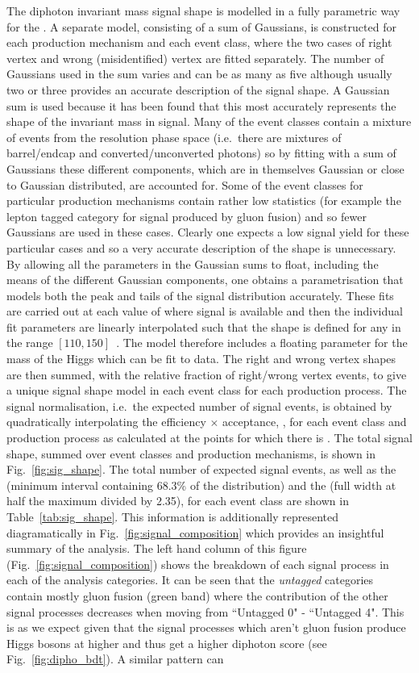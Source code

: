 The diphoton invariant mass signal shape is modelled in a fully parametric way for the \MFM. A separate model, consisting of a sum of Gaussians, is constructed for each production mechanism and each event class, where the two cases of right vertex and wrong (misidentified) vertex are fitted separately. The number of Gaussians used in the sum varies and can be as many as five although usually two or three provides an accurate description of the signal shape. A Gaussian sum is used because it has been found that this most accurately represents the shape of the invariant mass in signal. Many of the event classes contain a mixture of events from the resolution phase space (i.e.~there are mixtures of barrel/endcap and converted/unconverted photons) so by fitting with a sum of Gaussians these different components, which are in themselves Gaussian or close to Gaussian distributed, are accounted for. Some of the event classes for particular production mechanisms contain rather low \MC statistics (for example the lepton tagged category for signal produced by gluon fusion) and so fewer Gaussians are used in these cases. Clearly one expects a low signal yield for these particular cases and so a very accurate description of the shape is unnecessary. By allowing all the parameters in the Gaussian sums to float, including the means of the different Gaussian components, one obtains a parametrisation that models both the peak and tails of the signal distribution accurately. These fits are carried out at each value of \mH where signal \MC is available and then the individual fit parameters are linearly interpolated such that the shape is defined for any \mH in the range $[110,150]$~\GeV. The model therefore includes a floating parameter for the mass of the Higgs which can be fit to data. The right and wrong vertex shapes are then summed, with the relative fraction of right/wrong vertex events, to give a unique signal shape model in each event class for each production process. The signal normalisation, i.e.~the expected number of \SM signal events, is obtained by quadratically interpolating the efficiency $\times$ acceptance, \ea, for each event class and production process as calculated at the \mH points for which there is \MC. The total signal shape, summed over event classes and production mechanisms, is shown in Fig.~\ref{fig:sig_shape}. The total number of expected signal events, as well as the \sigeff (minimum interval containing 68.3\% of the distribution) and the \sigFW (full width at half the maximum divided by 2.35), for each event class are shown in Table~\ref{tab:sig_shape}. This information is additionally represented diagramatically in Fig.~\ref{fig:signal_composition} which provides an insightful summary of the analysis. The left hand column of this figure (Fig.~\ref{fig:signal_composition}) shows the breakdown of each signal process in each of the analysis categories. It can be seen that the \textit{untagged} categories contain mostly gluon fusion (green band) where the contribution of the other signal processes decreases when moving from ``Untagged 0" - ``Untagged 4". This is as we expect given that the signal processes which aren't gluon fusion produce Higgs bosons at higher \pT and thus get a higher diphoton \BDT score (see Fig.~\ref{fig:dipho_bdt}). A similar pattern can 